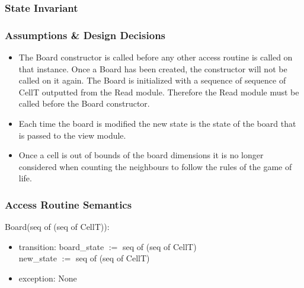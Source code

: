 \documentclass[12pt]{article}
\begin{document}
\subsubsection* {State Invariant}

\subsubsection* {Assumptions \& Design Decisions}

\begin{itemize}

\item The Board constructor is called before any other access
  routine is called on that instance. Once a Board has been created, the
  constructor will not be called on it again. The Board is initialized with a
  sequence of sequence of CellT outputted from the Read module. Therefore the Read
  module must be called before the Board constructor.

\item Each time the board is modified the new state is the state of the board that is passed to the view module.

\item Once a cell is out of bounds of the board dimensions it is no longer considered when counting the neighbours to follow the rules of the game of life.
\end{itemize}

\subsubsection* {Access Routine Semantics}

\noindent Board(seq of (seq of CellT)):
\begin{itemize}
\item transition:
board\_state $:=$ seq of (seq of CellT)\\
new\_state $:=$ seq of (seq of CellT)\\
\item exception: None
\end{itemize}
\end{document}

